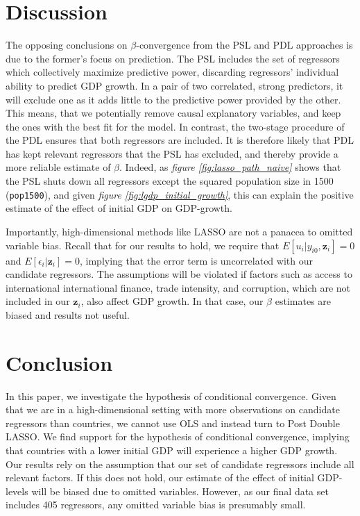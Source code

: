\documentclass[11pt]{article}
\begin{document}
\section{Discussion}
The opposing conclusions on $\beta$-convergence from the PSL and PDL approaches is due to the former's focus on prediction. The PSL includes the set of regressors which collectively maximize predictive power, discarding regressors' individual ability to predict GDP growth. In a pair of two correlated, strong predictors, it will exclude one as it adds little to the predictive power provided by the other. This means, that we potentially remove causal explanatory variables, and keep the ones with the best fit for the model. In contrast, the two-stage procedure of the PDL ensures that both regressors are included. It is therefore likely that PDL has kept relevant regressors that the PSL has excluded, and thereby provide a more reliable estimate of $\beta$. Indeed, as \textit{figure \ref{fig:lasso_path_naive}} shows that the PSL shuts down all regressors except the squared population size in 1500 (\texttt{pop1500}), and given \textit{figure \ref{fig:lgdp_initial_growth}}, this can explain the positive estimate of the effect of initial GDP on GDP-growth. 


Importantly, high-dimensional methods like LASSO are not a panacea to omitted variable bias. Recall that for our results to hold, we require that $E[u_i|y_{i0},\mathbf{z}_i]=0$ and $E[\epsilon_i|\mathbf{z}_i]=0$, implying that the error term is uncorrelated with our candidate regressors. The assumptions will be violated if factors such as access to international international finance, trade intensity, and corruption, which are not included in our $\mathbf{z}_i$, also affect GDP growth. In that case, our $\beta$ estimates are biased and results not useful.  

\section{Conclusion}
In this paper, we investigate the hypothesis of conditional convergence. Given that we are in a high-dimensional setting with more observations on candidate regressors than countries, we cannot use OLS and instead turn to Post Double LASSO. We find support for the hypothesis of conditional convergence, implying that countries with a lower initial GDP will experience a higher GDP growth. 
Our results rely on the assumption that our set of candidate regressors include all relevant factors. If this does not hold, our estimate of the effect of initial GDP-levels will be biased due to omitted variables. However, as our final data set includes 405 regressors, any omitted variable bias is presumably small. 
\end{document}
